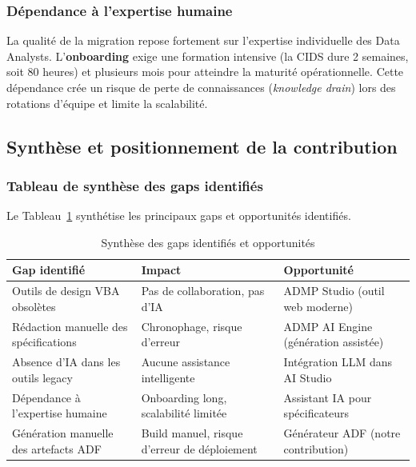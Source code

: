 \subsubsection{Dépendance à l'expertise humaine}
\label{subsubsec:dependance-expertise}

La qualité de la migration repose fortement sur l'expertise individuelle des
Data Analysts. L'\textbf{onboarding} exige une formation intensive (la CIDS
dure 2 semaines, soit 80 heures) et plusieurs mois pour atteindre la maturité
opérationnelle. Cette dépendance crée un risque de perte de connaissances
(\textit{knowledge drain}) lors des rotations d'équipe et limite la scalabilité.

\subsection{Synthèse et positionnement de la contribution}
\label{subsec:synthese-positionnement}

\subsubsection{Tableau de synthèse des gaps identifiés}
\label{subsubsec:gaps}

Le Tableau~\ref{tab:gaps-synthesis} synthétise les principaux gaps et
opportunités identifiés.

\begin{table}[htbp]
\centering
\caption{Synthèse des gaps identifiés et opportunités}
\label{tab:gaps-synthesis}
\begin{tabularx}{\textwidth}{XXX}
\toprule
\textbf{Gap identifié} & \textbf{Impact} & \textbf{Opportunité} \\
\midrule
Outils de design VBA obsolètes & Pas de collaboration, pas d'IA & ADMP Studio (outil web moderne) \\
\addlinespace
Rédaction manuelle des spécifications & Chronophage, risque d'erreur & ADMP AI Engine (génération assistée) \\
\addlinespace
Absence d'IA dans les outils legacy & Aucune assistance intelligente & Intégration LLM dans AI Studio \\
\addlinespace
Dépendance à l'expertise humaine & Onboarding long, scalabilité limitée & Assistant IA pour spécificateurs \\
\addlinespace
Génération manuelle des artefacts ADF & Build manuel, risque d'erreur de déploiement & Générateur ADF (notre contribution) \\
\bottomrule
\end{tabularx}
\end{table}

